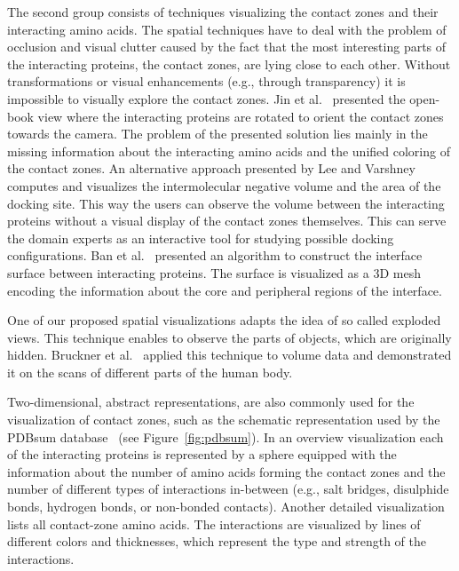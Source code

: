 \documentclass{bmcart}
\begin{document}
The second group consists of techniques visualizing the contact zones and their interacting amino acids.
The spatial techniques have to deal with the problem of occlusion and visual clutter caused by the fact that the most interesting parts of the interacting proteins, the contact zones, are lying close to each other.
Without transformations or visual enhancements (e.g., through transparency) it is impossible to visually explore the contact zones.
Jin et al.~\cite{Jin2014} presented the open-book view where the interacting proteins are rotated to orient the contact zones towards the camera.
The problem of the presented solution lies mainly in the missing information about the interacting amino acids and the unified coloring of the contact zones.
An alternative approach presented by Lee and Varshney~\cite{Varshney2003} computes and visualizes the intermolecular negative volume and the area of the docking site.%
This way the users can observe the volume between the interacting proteins without a visual display of the contact zones themselves.
This can serve the domain experts as an interactive tool for studying possible docking configurations.
Ban et al.~\cite{Ban2006} presented an algorithm to construct the interface surface between interacting proteins.
The surface is visualized as a 3D mesh encoding the information about the core and peripheral regions of the interface.

One of our proposed spatial visualizations adapts the idea of so called exploded views.
This technique enables to observe the parts of objects, which are originally hidden.
Bruckner et al.~\cite{Bruckner2006} applied this technique to volume data and demonstrated it on the scans of different parts of the human body.

Two-dimensional, abstract representations, are also commonly used for the visualization of contact zones, such as the schematic representation used by the PDBsum database~\cite{pdbsum} (see Figure~\ref{fig:pdbsum}).
In an overview visualization each of the interacting proteins is represented by a sphere equipped with the information about the number of amino acids forming the contact zones and the number of different types of interactions in-between (e.g., salt bridges, disulphide bonds, hydrogen bonds, or non-bonded contacts).
Another detailed visualization lists all contact-zone amino acids. 
The interactions are visualized by lines of different colors and thicknesses, which represent the type and strength of the interactions.
\end{document}

